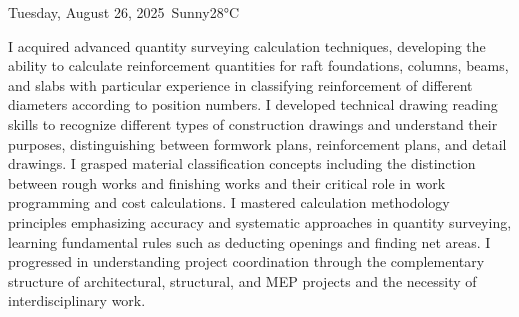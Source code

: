 \begin{dailyentry}{Tuesday, August 26, 2025}{\weathersunny\ Sunny}{28°C}
\begin{workcontent}
\begin{center}
{%
}
\end{center}
\end{workcontent}

\begin{skillslearned}
\item[] I acquired advanced quantity surveying calculation techniques, developing the ability to calculate reinforcement quantities for raft foundations, columns, beams, and slabs with particular experience in classifying reinforcement of different diameters according to position numbers. I developed technical drawing reading skills to recognize different types of construction drawings and understand their purposes, distinguishing between formwork plans, reinforcement plans, and detail drawings. I grasped material classification concepts including the distinction between rough works and finishing works and their critical role in work programming and cost calculations. I mastered calculation methodology principles emphasizing accuracy and systematic approaches in quantity surveying, learning fundamental rules such as deducting openings and finding net areas. I progressed in understanding project coordination through the complementary structure of architectural, structural, and MEP projects and the necessity of interdisciplinary work.
\end{skillslearned}


\end{dailyentry}
